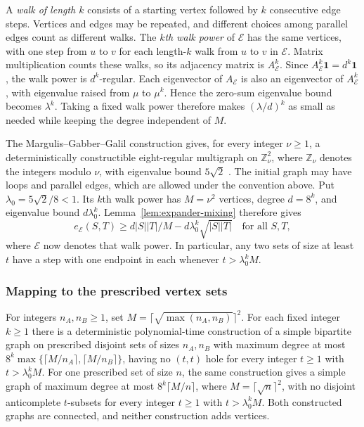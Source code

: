 A \emph{walk of length $k$} consists of a starting vertex followed
by $k$ consecutive edge steps. Vertices and edges may be repeated,
and different choices among parallel edges count as different
walks. The \emph{$k$th walk power} of $\mathcal E$ has the same
vertices, with one step from $u$ to $v$ for each length-$k$ walk
from $u$ to $v$ in $\mathcal E$. Matrix multiplication counts these
walks, so its adjacency matrix is $A_{\mathcal E}^k$. Since
$A_{\mathcal E}^k\mathbf1=d^k\mathbf1$, the walk power is $d^k$-regular.
Each eigenvector of $A_{\mathcal E}$ is also an eigenvector of
$A_{\mathcal E}^k$, with eigenvalue raised from $\mu$ to $\mu^k$.
Hence the zero-sum
eigenvalue bound becomes $\lambda^k$. Taking a fixed walk power
therefore makes $(\lambda/d)^k$ as small as needed while keeping
the degree independent of $M$.

The Margulis--Gabber--Galil construction gives, for every integer
$\nu\ge1$, a deterministically constructible eight-regular multigraph
on $\mathbb Z_\nu^2$, where $\mathbb Z_\nu$ denotes the integers modulo
$\nu$, with eigenvalue bound $5\sqrt2$
\cite[Construction~8.1 and Theorem~8.2]{HLW2006}. The initial graph
may have loops and parallel edges, which are allowed under the
convention above.
Put $\lambda_0=5\sqrt2/8<1$. Its $k$th walk power has
$M=\nu^2$ vertices, degree $d=8^k$, and eigenvalue bound
$d\lambda_0^k$. Lemma~\ref{lem:expander-mixing} therefore gives
\begin{equation}\label{eq:factor-expander-mixing}
 e_{\mathcal E}(S,T)\ge d|S||T|/M-d\lambda_0^k\sqrt{|S||T|}
 \quad\text{for all }S,T,
\end{equation}
where $\mathcal E$ now denotes that walk power.
In particular, any two sets of size at least $t$ have a step with
one endpoint in each whenever $t>\lambda_0^kM$.

\subsubsection{Mapping to the prescribed vertex sets}

\begin{lemma}\label{lem:factor-expanders}
For integers $n_A,n_B\ge1$, set
$M=\lceil\sqrt{\max(n_A,n_B)}\rceil^2$.
For each fixed integer $k\ge1$ there is a deterministic polynomial-time
construction of a simple bipartite graph on prescribed disjoint
sets of sizes $n_A,n_B$ with maximum degree at most
$8^k\max\{\lceil M/n_A\rceil,\lceil M/n_B\rceil\}$,
having no $(t,t)$ hole for every integer $t\ge1$ with
$t>\lambda_0^kM$.
For one prescribed set of size $n$, the same construction gives a
simple graph of maximum degree at most $8^k\lceil M/n\rceil$,
where $M=\lceil\sqrt n\rceil^2$, with no disjoint anticomplete
$t$-subsets for every integer $t\ge1$ with $t>\lambda_0^kM$.
Both constructed graphs are connected, and neither construction adds
vertices.
\end{lemma}

